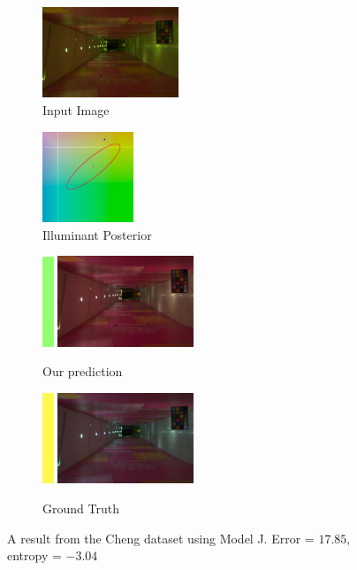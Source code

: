 \documentclass[10pt,twocolumn,letterpaper]{article}
\begin{document}
\begin{figure}[!]
\centering
  \begin{subfigure}[!]{1.7in}
    \includegraphics[width=1.6in]{figures/results/cheng/00000067_input.jpg}
    \caption{\footnotesize Input Image}
  \end{subfigure}
  \begin{subfigure}[!]{1.17in}
    \includegraphics[width=1.07in]{figures/results/cheng/00000067_chroma.png}
    \caption{\footnotesize Illuminant Posterior}
  \end{subfigure}
\begin{subfigure}[!]{1.9in}
    \includegraphics[width=0.133in]{figures/results/cheng/00000067_illum.png}\!
    \includegraphics[width=1.6in]{figures/results/cheng/00000067_prediction.jpg}
    \caption{\footnotesize Our prediction}
  \end{subfigure}
  \begin{subfigure}[!]{1.9in}
    \includegraphics[width=0.133in]{figures/results/cheng/00000067_illum_true.png}\!
    \includegraphics[width=1.6in]{figures/results/cheng/00000067_true.jpg}
    \caption{\footnotesize Ground Truth}
  \end{subfigure}
  \caption{
    A result from the Cheng dataset using Model J. Error = $17.85$\textdegree, entropy = $-3.04$
    \label{fig:results15}
  }
\end{figure}
\end{document}
